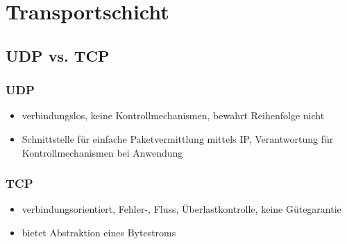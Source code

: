 \section{Transportschicht}
\subsection{UDP vs. TCP}
\subsubsection{UDP}
\begin{itemize}
	\item verbindungslos, keine Kontrollmechanismen, bewahrt Reihenfolge nicht
	\item Schnittstelle für einfache Paketvermittlung mittels IP, Verantwortung für Kontrollmechanismen bei Anwendung 
\end{itemize}
\subsubsection{TCP}
\begin{itemize}
	\item verbindungsorientiert, Fehler-, Fluss, Überlastkontrolle, keine Gütegarantie
	\item bietet Abstraktion eines Bytestroms 
\end{itemize}
